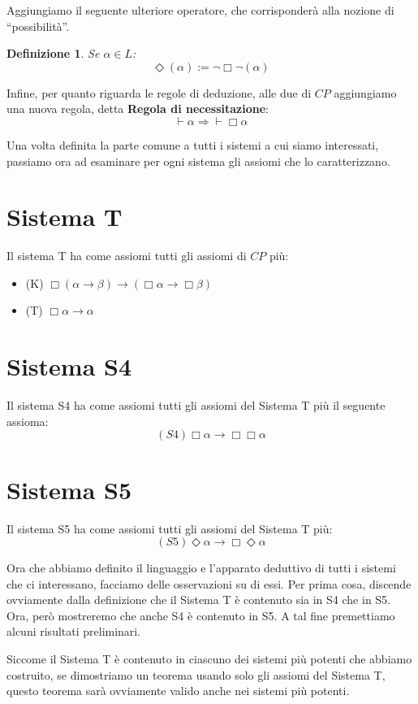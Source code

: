 \documentclass[a4paper, 12pt]{article}
\newtheorem{definition}{Definizione}
\begin{document}
Aggiungiamo il seguente ulteriore operatore, che corrisponderà alla nozione di ``possibilità''.

\begin{definition}
Se $\alpha \in L$:
$$\Diamond (\alpha) := \neg \Box \neg (\alpha)$$
\end{definition}

Infine, per quanto riguarda le regole di deduzione, alle due di $CP$ aggiungiamo
una nuova regola, detta \textbf{Regola di necessitazione}:
$$\vdash \alpha \Rightarrow \vdash \Box \alpha$$

Una volta definita la parte comune a tutti i sistemi a cui siamo interessati,
passiamo ora ad esaminare per ogni sistema gli assiomi che lo caratterizzano.

\section{Sistema T}
Il sistema T ha come assiomi tutti gli assiomi di $CP$ più:
\begin{itemize}
\item (K) $\Box (\alpha \rightarrow \beta) \rightarrow (\Box \alpha \rightarrow \Box \beta)$
\item (T) $\Box \alpha \rightarrow \alpha$
\end{itemize}

\section{Sistema S4}
Il sistema S4 ha come assiomi tutti gli assiomi del Sistema T più il seguente assioma:
$$(S4) \Box \alpha \rightarrow \Box \Box \alpha$$

\section{Sistema S5}
Il sistema S5 ha come assiomi tutti gli assiomi del Sistema T più:
$$(S5) \Diamond \alpha \rightarrow \Box \Diamond \alpha$$


Ora che abbiamo definito il linguaggio e l'apparato deduttivo di tutti i sistemi
che ci interessano, facciamo delle osservazioni su di essi.
Per prima cosa, discende ovviamente dalla definizione che il Sistema T è contenuto
sia in S4 che in S5.
Ora, però mostreremo che anche S4 è contenuto in S5. A tal fine premettiamo alcuni risultati
preliminari.

Siccome il Sistema T è contenuto in ciascuno dei sistemi più potenti che abbiamo costruito,
se dimostriamo un teorema usando solo gli assiomi del Sistema T, questo teorema sarà ovviamente valido
anche nei sistemi più potenti.
\end{document}
